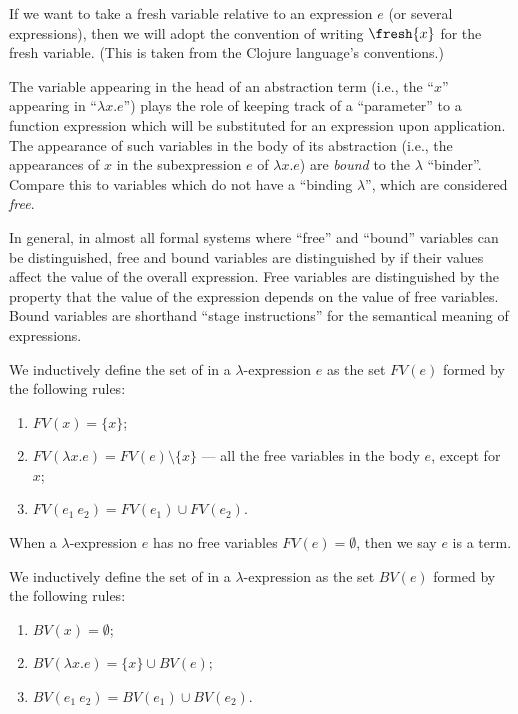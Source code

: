 \begin{node}[Syntax]
\begin{definition}
If we want to take a fresh variable relative to an expression $e$ (or
several expressions), then we will adopt the convention of writing
$\fresh{x}$ for the fresh variable. (This is taken from the Clojure
language's conventions.)
\end{definition}

\begin{node}\label{untyped-lambda-0007}%
The variable appearing in the head of an abstraction term (i.e., the
``$x$'' appearing in ``$\lambda x.e$'') plays the role of keeping track
of a ``parameter'' to a function expression which will be substituted
for an expression upon application. The appearance of such variables in
the body of its abstraction (i.e., the appearances of $x$ in the
subexpression $e$ of $\lambda x.e$) are \emph{bound} to the $\lambda$
``binder''. Compare this to variables which do not have a ``binding
$\lambda$'', which are considered \emph{free}.

In general, in almost all formal systems where ``free'' and ``bound''
variables can be distinguished, free and bound variables are
distinguished by if their values affect the value of the overall
expression. Free variables are distinguished by the property that the
value of the expression depends on the value of free variables. Bound
variables are shorthand ``stage instructions'' for the semantical
meaning of expressions.

\begin{definition}\label{untyped-lambda-0005}%
We inductively define the set of  in a
$\lambda$-expression $e$ as the set $FV(e)$ formed by the following rules:
\begin{enumerate}
\item $FV(x)=\{x\}$;
\item $FV(\lambda x.e)=FV(e)\setminus\{x\}$ --- all the free variables
  in the body $e$, except for $x$;
\item $FV(e_{1}~e_{2})=FV(e_{1})\cup FV(e_{2})$.
\end{enumerate}
\end{definition}

\begin{definition}\label{untyped-lambda-0012}%
When a $\lambda$-expression $e$ has no free variables $FV(e)=\emptyset$,
then we say $e$ is a  term.
\end{definition}

\begin{definition}\label{untyped-lambda-0006}%
We inductively define the set of  in a
$\lambda$-expression as the set $BV(e)$ formed by the following rules:
\begin{enumerate}
\item $BV(x)=\emptyset$;
\item $BV(\lambda x.e)=\{x\}\cup BV(e)$;
\item $BV(e_{1}~e_{2})=BV(e_{1})\cup BV(e_{2})$.
\end{enumerate}
\end{definition}


\end{node}
\end{node}
